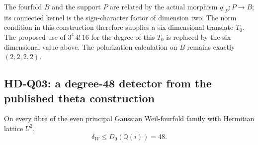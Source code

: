 The fourfold $B$ and the support $P$ are related by the actual morphism $q|_P:P\to B$; its connected kernel is the sign-character factor of dimension two. The norm condition in this construction therefore supplies a six-dimensional translate $T_0$. The proposed use of $3^4\,4!\,16$ for the degree of this $T_0$ is replaced by the six-dimensional value above. The polarization calculation on $B$ remains exactly $(2,2,2,2)$.

\subsection{HD-Q03: a degree-48 detector from the published theta construction}
On every fibre of the even principal Gaussian Weil-fourfold family with Hermitian lattice $U^2$,
\begin{equation}\label{eq:D0-Gaussian}
 \boxed{\delta_W\le D_0(\mathbb Q(i))=48.}
\end{equation}

